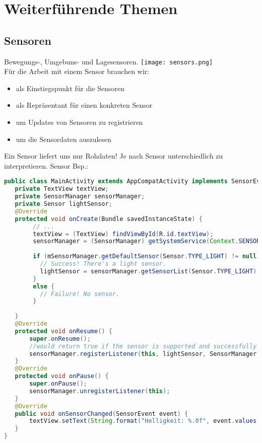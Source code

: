 \section{Weiterführende Themen}
\subsection{Sensoren}
Bewegungs-, Umgebuns- und Lagesensoren.
\texttt{[image: sensors.png]} \\
Für die Arbeit mit einem Sensor brauchen wir:
\begin{itemize}
\item {} als Einstiegspunkt für die Sensoren
\item {} als Repräsentant für einen konkreten Sensor
\item {} um Updates von Sensoren zu registrieren
\item {} um die Sensordaten auszulesen
\end{itemize}
Ein Sensor liefert uns nur Rohdaten! Je nach Sensor unterschiedlich zu interpretieren. Sensor Bsp.:
\begin{lstlisting}[language=java]
public class MainActivity extends AppCompatActivity implements SensorEventListener {
   private TextView textView;
   private SensorManager sensorManager;
   private Sensor lightSensor;
   @Override
   protected void onCreate(Bundle savedInstanceState) {
        // ...
        textView = (TextView) findViewById(R.id.textView);
        sensorManager = (SensorManager) getSystemService(Context.SENSOR_SERVICE);
       
        if (mSensorManager.getDefaultSensor(Sensor.TYPE_LIGHT) != null){
          // Success! There's a light sensor.
          lightSensor = sensorManager.getSensorList(Sensor.TYPE_LIGHT).get(0);
        }
        else {
          // Failure! No sensor.
        }
        
   }
   @Override
   protected void onResume() {
       super.onResume();
       //would return true if the sensor is supported and successfully enabled.
       sensorManager.registerListener(this, lightSensor, SensorManager.SENSOR_DELAY_NORMAL);
   }
   @Override
   protected void onPause() {
       super.onPause();
       sensorManager.unregisterListener(this);
   }
   @Override
   public void onSensorChanged(SensorEvent event) {
       textView.setText(String.format("Helligkeit: %.0f", event.values[0]));
   }
}
\end{lstlisting}
